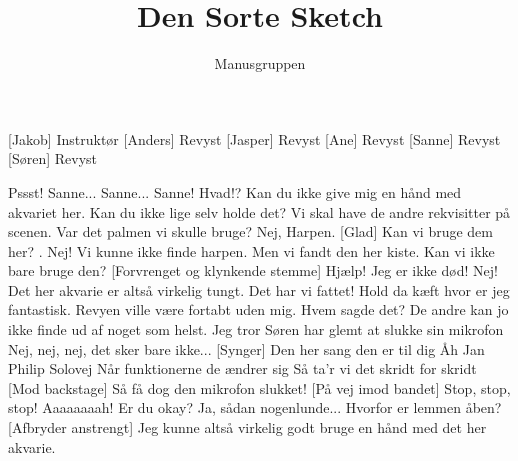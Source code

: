 \documentclass[a4paper,11pt]{article}
\title{Den Sorte Sketch}
\author{Manusgruppen}
\begin{document}
\maketitle

\begin{roles}
[Jakob] Instruktør
[Anders] Revyst
[Jasper] Revyst
[Ane] Revyst
[Sanne] Revyst
[Søren] Revyst
\end{roles}

\begin{sketch}
 Pssst! Sanne... Sanne...  Sanne!
 Hvad!?
 Kan du ikke give mig en hånd med akvariet her.
 Kan du ikke lige selv holde det? Vi skal have de andre rekvisitter på scenen.  
 Var det palmen vi skulle bruge?
 Nej, Harpen.
[Glad]  Kan vi bruge dem her? . 
 Nej!
 Vi kunne ikke finde harpen.
 Men vi fandt den her kiste. Kan vi ikke bare bruge den?
[Forvrenget og klynkende stemme] Hjælp! Jeg er ikke død!
 Nej!
 Det her akvarie er altså virkelig tungt.
 Det har vi fattet!
 Hold da kæft hvor er jeg fantastisk. Revyen ville være fortabt uden mig. 
 Hvem sagde det?
 De andre kan jo ikke finde ud af noget som helst.
 Jeg tror Søren har glemt at slukke sin mikrofon
 Nej, nej, nej, det sker bare ikke...
[Synger] Den her sang den er til dig
Åh Jan Philip Solovej
Når funktionerne de ændrer sig
Så ta'r vi det skridt for skridt 
[Mod backstage] Så få dog den mikrofon slukket!
[På vej imod bandet] Stop, stop, stop!  Aaaaaaaah!
 Er du okay?
  Ja, sådan nogenlunde... Hvorfor er lemmen åben?
[Afbryder anstrengt] Jeg kunne altså virkelig godt bruge en hånd med det her akvarie.

\end{sketch}
\end{document}
